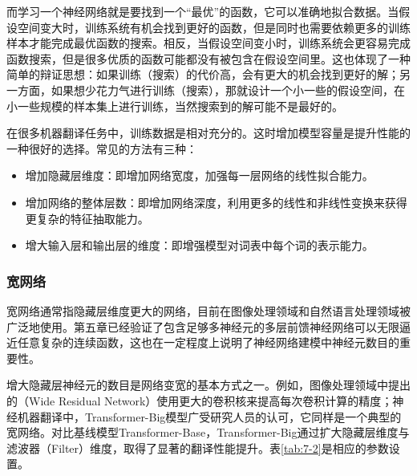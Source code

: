 \parinterval 而学习一个神经网络就是要找到一个``最优''的函数，它可以准确地拟合数据。当假设空间变大时，训练系统有机会找到更好的函数，但是同时也需要依赖更多的训练样本才能完成最优函数的搜索。相反，当假设空间变小时，训练系统会更容易完成函数搜索，但是很多优质的函数可能都没有被包含在假设空间里。这也体现了一种简单的辩证思想：如果训练（搜索）的代价高，会有更大的机会找到更好的解；另一方面，如果想少花力气进行训练（搜索），那就设计一个小一些的假设空间，在小一些规模的样本集上进行训练，当然搜索到的解可能不是最好的。

\parinterval 在很多机器翻译任务中，训练数据是相对充分的。这时增加模型容量是提升性能的一种很好的选择。常见的方法有三种：

\begin{itemize}
\vspace{0.5em}
\item 增加隐藏层维度：即增加网络宽度，加强每一层网络的线性拟合能力。
\vspace{0.5em}
\item 增加网络的整体层数：即增加网络深度，利用更多的线性和非线性变换来获得更复杂的特征抽取能力。
\vspace{0.5em}
\item 增大输入层和输出层的维度：即增强模型对词表中每个词的表示能力。
\end{itemize}

\vspace{-0.5em}
\subsubsection{宽网络}

\parinterval 宽网络通常指隐藏层维度更大的网络，目前在图像处理领域和自然语言处理领域被广泛地使用。第五章已经验证了包含足够多神经元的多层前馈神经网络可以无限逼近任意复杂的连续函数\cite{Hornic1989Multilayer}，这也在一定程度上说明了神经网络建模中神经元数目的重要性。

\parinterval 增大隐藏层神经元的数目是网络变宽的基本方式之一。例如，图像处理领域中提出的{\small{}}（Wide Residual Network）使用更大的卷积核来提高每次卷积计算的精度\cite{DBLP:conf/bmvc/ZagoruykoK16}；神经机器翻译中，Transformer-Big模型广受研究人员的认可\cite{NIPS2017_7181}，它同样是一个典型的宽网络。对比基线模型Transformer-Base，Transformer-Big通过扩大隐藏层维度与滤波器（Filter）维度，取得了显著的翻译性能提升。表\ref{tab:7-2}是相应的参数设置。

